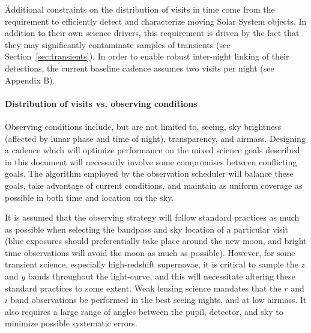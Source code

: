 

\G{Additional constraints on the distribution of visits in time come from
the requirement to efficiently detect and characterize moving Solar System
objects. In addition to their own science drivers, this requirement is driven
by the fact that they may significantly contaminate samples of transients
(see Section~\ref{sec:transients}).  In order to enable robust inter-night
linking of their detections, the current baseline cadence assumes two
visits per night  (see Appendix B).}


\paragraph{Distribution of visits vs. observing conditions\\}

Observing conditions include, but are not limited to, seeing, sky
brightness (affected by lunar phase and time of night), transparency, and
airmass. Designing a cadence which will optimize performance on the mixed
science goals described in this document will necessarily involve some
compromises between conflicting goals. The algorithm employed by the
observation scheduler will balance these goals, take advantage of current
conditions, and maintain as uniform coverage as possible in both time and
location on the sky.

It is assumed that the observing strategy will follow standard practices as
much as possible when selecting the bandpass and sky location of a
particular visit (\eg blue exposures should preferentially take
place around the new moon, and bright time observations will avoid the moon
as much as possible). However, for some transient science, especially high-redshift
supernovae, it is critical to sample the $z$ and $y$ bands throughout the
light-curve, and this will necessitate altering these standard practices to
some extent. Weak lensing science mandates that the $r$ and $i$ band
observations be performed in the best seeing nights, and at low airmass. It
also requires a large range of angles between the pupil, detector, and sky
to minimize possible systematic errors.



